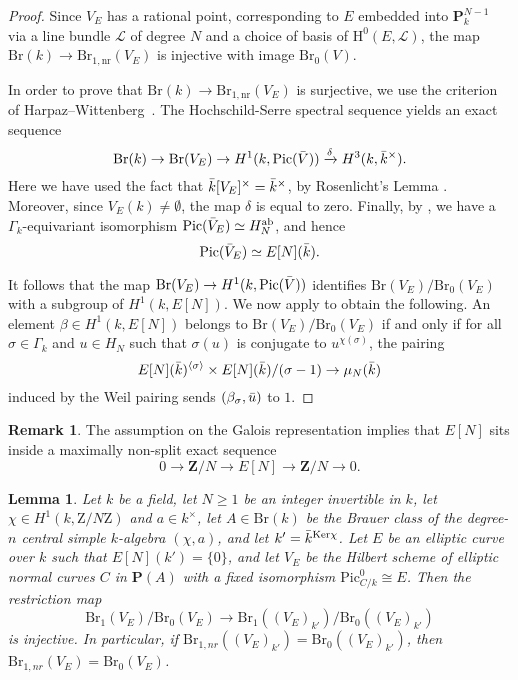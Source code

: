 \documentclass[10pt,letterpaper,twoside]{article}
\newcommand{\Lscr}{\mathcal{L}}
\renewcommand{\H}{\mathrm{H}}
\newcommand{\Z}{\mathrm{Z}}
\renewcommand{\1}{\mathbf{1}}
\newcommand{\bP}{\mathbf{P}}
\newcommand{\bZ}{\mathbf{Z}}
\newcommand{\nr}{\mathrm{nr}}
\renewcommand{\geq}{\geqslant}
\newcommand{\Pic}{\mathrm{Pic}}
\newcommand{\Br}{\mathrm{Br}}
\newcommand{\iso}{\cong}
\theoremstyle{plain}
\newtheorem{lemma}[theorem]{Lemma}
\theoremstyle{plain}
\theoremstyle{definition}
\theoremstyle{named}
\theoremstyle{definition}
\newtheorem{remark}[theorem]{Remark}
\begin{document}
\begin{proof}
    Since $V_E$ has a rational point, corresponding to $E$ embedded into $\bP^{N-1}_k$
    via a line bundle $\Lscr$ of degree $N$ and a choice of basis of $\H^0(E,\Lscr)$, the map
    $\Br(k)\rightarrow\Br_{1,\nr}(V_E)$ is injective with image $\Br_0(V)$. 
    
    In order to prove that $\Br(k)\rightarrow\Br_{1,\nr}(V_E)$ is surjective, we use the criterion of
    Harpaz--Wittenberg~\cite{harpaz-wittenberg-massey}. The Hochschild-Serre spectral sequence yields an exact sequence
    \[\Br(k)\to \Br(V_E)\to H^1(k,\Pic(\Bar{V}))\xrightarrow{\delta}H^3(k,\Bar{k}^\times).\]
    Here we have used the fact that $\Bar{k}[V_E]^\times=\Bar{k}^\times$, by Rosenlicht's Lemma \cite{}. Moreover, since $V_E(k)\neq \emptyset$, the map $\delta$ is equal to zero. Finally, by \cite{}, we have a $\Gamma_k$-equivariant isomorphism $\Pic(\Bar{V}_E)\simeq H^{\mathrm{ab}}_N$, and hence
    \[\Pic(\Bar{V}_E)\simeq E[N](\Bar{k}).\]
    
    It follows that the map $\Br(V_E)\to H^1(k,\Pic(\Bar{V}))$ identifies $\Br(V_E)/\Br_0(V_E)$ with a subgroup of $H^1(k,E[N])$. We now apply \cite[Proposition 3.3]{harpaz-wittenberg-massey} to obtain the following. An element $\beta\in H^1(k,E[N])$ belongs to $\Br(V_E)/\Br_0(V_E)$ if and only if for all $\sigma\in \Gamma_k$ and $u\in H_N$ such that $\sigma(u)$ is conjugate to $u^{\chi(\sigma)}$, the pairing
    \[E[N](\Bar{k})^{\langle\sigma\rangle}\times E[N](\Bar{k})/(\sigma-1)\to \mu_N(\Bar{k})\]
    induced by the Weil pairing sends $(\beta_{\sigma},\Bar{u})$ to $1$. 
\end{proof}

\begin{remark}
    The assumption on the Galois representation implies that $E[N]$ sits inside a maximally non-split exact sequence
    $$0\rightarrow\bZ/N\rightarrow E[N]\rightarrow\bZ/N\rightarrow 0.$$
\end{remark}



\begin{lemma}
    Let $k$ be a field, let $N\geq 1$ be an integer invertible in $k$, let $\chi\in H^1(k,\Z/N\Z)$ and $a\in k^\times$, let $A\in \Br(k)$ be the Brauer class of the degree-$n$ central simple $k$-algebra $(\chi,a)$, and let $k'=\Bar{k}^{\mathrm{Ker}\chi}$. Let $E$ be an elliptic curve over $k$ such that $E[N](k')=\{0\}$, and let $V_E$ be the Hilbert scheme of elliptic normal curves $C$ in $\bP(A)$
    with a fixed isomorphism $\Pic_{C/k}^0\iso E$. Then the restriction map
    \[\Br_1(V_E)/\Br_0(V_E)\to \Br_1((V_E)_{k'})/\Br_0((V_E)_{k'})\]
    is injective. In particular, if $\Br_{1,nr}((V_E)_{k'})=\Br_0((V_E)_{k'})$, then $\Br_{1,nr}(V_E)=\Br_0(V_E)$.
\end{lemma}
    
\end{document}
